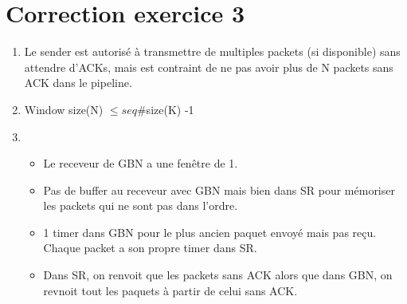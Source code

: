 \documentclass[a4paper, 11pt, titlepage]{article}
\begin{document}
\section{Correction exercice 3}
\begin{enumerate}[label=(\alph*)]
\item
Le sender est autorisé à transmettre de multiples packets (si disponible) sans attendre d'ACKs, mais est contraint de ne pas avoir plus de N packets sans ACK dans le pipeline.

\item 
Window size(N) $\leq seq\# $size(K) -1 

\item  
\begin{itemize}
\item Le receveur de GBN a une fenêtre de 1.
\item Pas de buffer au receveur avec GBN mais bien dans SR pour mémoriser les packets qui ne sont pas dans l'ordre.
\item 1 timer dans GBN pour le plus ancien paquet envoyé mais pas reçu. Chaque packet a son propre timer dans SR.
\item Dans SR, on renvoit que les packets sans ACK alors que dans GBN, on revnoit tout les paquets à partir de celui sans ACK.
\end{itemize}

\end{enumerate}
\end{document}
